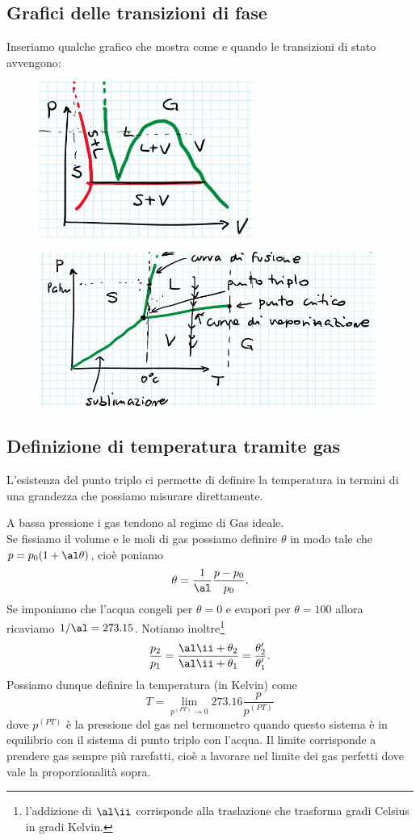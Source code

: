 \newpage


\subsection{Grafici delle transizioni di fase}
Inseriamo qualche grafico che mostra come e quando le transizioni di stato avvengono:

\begin{figure}[!htb]
    \centering
    \includegraphics[width=7cm]{images/Grafico_p_V_transizione_di_stato.png}
\end{figure}

\begin{figure}[!htb]
    \centering
    \includegraphics[width=11cm]{images/Grafico_p_T_transizione_stato.png}
\end{figure}


\subsection{Definizione di temperatura tramite gas}
L'esistenza del punto triplo ci permette di definire la temperatura in termini di una grandezza che possiamo misurare direttamente. 
\medskip

\noindent
A bassa pressione i gas tendono al regime di Gas ideale.\\
Se fissiamo il volume e le moli di gas possiamo definire $\theta$ in modo tale che $p=p_0(1+\al\theta)$, cio\`e poniamo 
\[\theta=\frac1\al\frac{p-p_0}{p_0}.\] 
Se imponiamo che l'acqua congeli per $\theta=0$ e evapori per $\theta=100$ allora ricaviamo $1/\al=273.15$. Notiamo inoltre\footnote{l'addizione di $\al\ii$ corrisponde alla traslazione che trasforma gradi Celsius in gradi Kelvin.}
\[\frac{p_2}{p_1}=\frac{\al\ii+\theta_2}{\al\ii +\theta_1}=\frac{\theta_2'}{\theta_1'}.\]
Possiamo dunque definire la temperatura (in Kelvin) come
\[T=\lim_{p^{(PT)}\to 0}273.16 \frac{p}{p^{(PT)}}\]
dove $p^{(PT)}$ \`e la pressione del gas nel termometro quando questo sistema \`e in equilibrio con il sistema di punto triplo con l'acqua. Il limite corrisponde a prendere gas sempre pi\`u rarefatti, cio\`e a lavorare nel limite dei gas perfetti dove vale la proporzionalit\`a sopra.
\medskip

